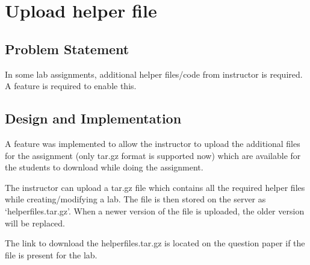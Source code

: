 \section{Upload helper file}
\subsection{Problem Statement}
In some lab assignments, additional helper files/code from instructor is required. A feature is required to enable this.
\subsection{Design and Implementation}
A feature was implemented to allow the instructor to upload the additional files for the assignment (only tar.gz format is supported now) which are available for the students to download while doing the assignment.

The instructor can upload a tar.gz file which contains all the required helper files while creating/modifying a lab. The file is then stored on the server as `helperfiles.tar.gz'. When a newer version of the file is uploaded, the older version will be replaced.

The link to download the helperfiles.tar.gz is located on the question paper if the file is present for the lab.